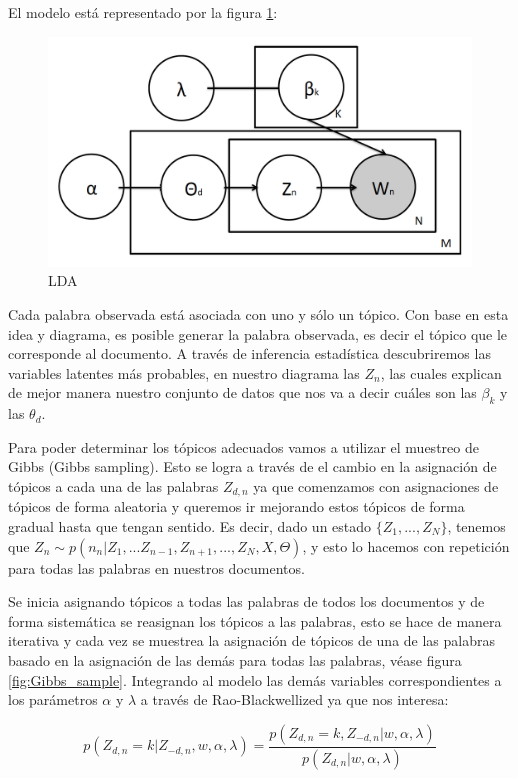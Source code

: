 El modelo está representado por la figura \ref{lda}:

\begin{figure}[H]
\centering
\includegraphics[width=.6\textwidth]{Figures/lda.png}
\caption{LDA}
\label{lda}
\end{figure}

Cada palabra observada está asociada con uno y sólo un tópico. Con base en esta idea y diagrama, es posible generar la palabra observada, es decir el tópico que le corresponde al documento.  A través de inferencia estadística descubriremos las variables latentes más probables, en nuestro diagrama las $Z_n$, las cuales explican de mejor manera nuestro conjunto de datos que nos va a decir cuáles son las $\beta_k$ y las $\theta_d$.
\vspace{0.5cm}

\noindent Para poder determinar los tópicos adecuados vamos a utilizar el muestreo de Gibbs (Gibbs sampling). Esto se logra a través de el cambio en la asignación de tópicos a cada una de las palabras $Z_{d,n}$ ya que comenzamos con asignaciones de tópicos de forma aleatoria y queremos ir mejorando estos tópicos de forma gradual hasta que tengan sentido. Es decir, dado un estado $\{Z_1, ..., Z_N\}$, tenemos que $Z_n \sim p(n_n|Z_1,...Z_{n-1}, Z_{n+1},..., Z_N, X,\Theta)$, y esto lo hacemos con repetición para todas las palabras en nuestros documentos.
\vspace{0.5cm}



\noindent Se inicia asignando tópicos a todas las palabras de todos los documentos y de forma sistemática se reasignan los tópicos a las palabras,  esto se hace de manera iterativa y cada vez se muestrea  la asignación de tópicos de una de las palabras basado en la asignación de las demás para todas las palabras, véase figura \ref{fig:Gibbs_sample}. Integrando al modelo las demás variables correspondientes a los parámetros $\alpha$ y $\lambda$ a través de Rao-Blackwellized \citep{Canini} ya que nos interesa:

\[ p(Z_{d,n}=k | Z_{-d,n}, w, \alpha, \lambda)= \frac{p(Z_{d,n}=k, Z_{-d,n}| w, \alpha, \lambda)}{p(Z_{d,n}| w, \alpha, \lambda)} \]


